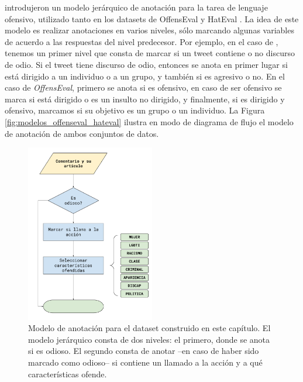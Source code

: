 \citet{zampieri2019predicting} introdujeron un modelo jerárquico de anotación para la tarea de lenguaje ofensivo, utilizado tanto en los datasets de OffensEval \cite{zampieri2019semeval2019} y HatEval \cite{hateval2019semeval}. La idea de este modelo es realizar anotaciones en varios niveles, sólo marcando algunas variables de acuerdo a las respuestas del nivel predecesor. Por ejemplo, en el caso de \hateval{}, tenemos un primer nivel que consta de marcar si un tweet contiene o no discurso de odio. Si el tweet tiene discurso de odio, entonces se anota en primer lugar si está dirigido a un individuo o a un grupo, y también si es agresivo o no. En el caso de \emph{OffensEval}, primero se anota si es ofensivo, en caso de ser ofensivo se marca si está dirigido o es un insulto no dirigido, y finalmente, si es dirigido y ofensivo, marcamos si su objetivo es un grupo o un individuo.  La Figura \ref{fig:modelos_offenseval_hateval} ilustra en modo de diagrama de flujo el modelo de anotación de ambos conjuntos de datos.


%
%
%



\begin{figure}
    \centering
    \includegraphics[width=0.5\textwidth]{img/05/annotation_model.pdf}
    \caption{Modelo de anotación para el dataset construido en este capítulo. El modelo jerárquico consta de dos niveles: el primero, donde se anota si es odioso. El segundo consta de anotar --en caso de haber sido marcado como odioso-- si contiene un llamado a la acción y a qué características ofende.}
    \label{fig:annotation_model}
\end{figure}


